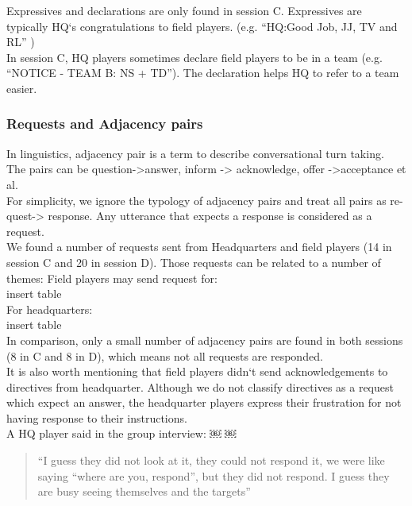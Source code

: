 Expressives and declarations are only found in session C. Expressives are typically HQ`s congratulations to field players. (e.g. ``HQ:Good Job, JJ, TV and RL'' )\\

In session C, HQ players sometimes declare field players to be in a team (e.g. ``NOTICE - TEAM B: NS + TD''). The declaration helps HQ to refer to a team easier.\\

\subsubsection{Requests and Adjacency pairs}
In linguistics, adjacency pair is a term to describe conversational turn taking. The pairs can be question->answer, inform -> acknowledge, offer ->acceptance et al.\\

For simplicity, we ignore the typology of adjacency pairs and treat all pairs as re- quest-> response. Any utterance that expects a response is considered as a request.\\

We found a number of requests sent from Headquarters and field players (14 in session C and 20 in session D). Those requests can be related to a number of themes:
Field players may send request for: \\

insert table \\

For headquarters:\\

insert table \\


In comparison, only a small number of adjacency pairs are found in both sessions (8 in C and 8 in D), which means not all requests are responded.\\

It is also worth mentioning that field players didn`t send acknowledgements to directives from headquarter. Although we do not classify directives as a request which expect an answer, the headquarter players express their frustration for not having response to their instructions.\\

A HQ player said in the group interview:
￼
￼

\begin{quote}
``I guess they did not look at it, they could not respond it, we were like saying ``where are you, respond'', but they did not respond. I guess they are busy seeing themselves and the targets''
\end{quote}

